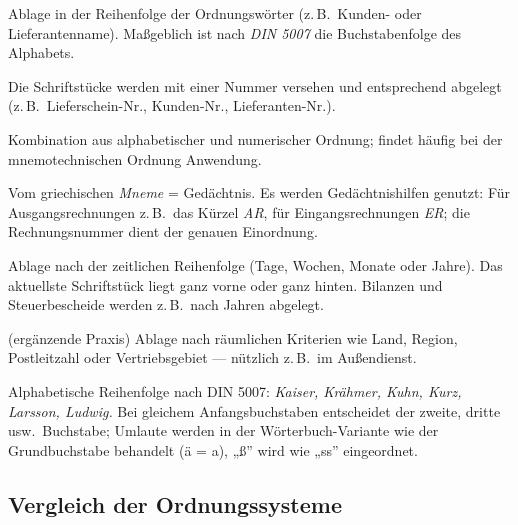 \documentclass[11pt, a4paper]{article}
\begin{document}
\begin{description}[leftmargin=1.2cm, style=nextline]
  \item[Alphabetische Ordnung] Ablage in der Reihenfolge der Ordnungswörter (z.\,B.\
    Kunden- oder Lieferantenname). Maßgeblich ist nach \emph{DIN 5007} die Buchstabenfolge
    des Alphabets.
  \item[Numerische Ordnung] Die Schriftstücke werden mit einer Nummer versehen und
    entsprechend abgelegt (z.\,B.\ Lieferschein-Nr., Kunden-Nr., Lieferanten-Nr.).
  \item[Alphanumerische Ordnung] Kombination aus alphabetischer und numerischer Ordnung;
    findet häufig bei der mnemotechnischen Ordnung Anwendung.
  \item[Mnemotechnische Ordnung] Vom griechischen \emph{Mneme} = Gedächtnis. Es werden
    Gedächtnishilfen genutzt: Für Ausgangsrechnungen z.\,B.\ das Kürzel \emph{AR}, für
    Eingangsrechnungen \emph{ER}; die Rechnungsnummer dient der genauen Einordnung.
  \item[Chronologische Ordnung] Ablage nach der zeitlichen Reihenfolge (Tage, Wochen,
    Monate oder Jahre). Das aktuellste Schriftstück liegt ganz vorne oder ganz hinten.
    Bilanzen und Steuerbescheide werden z.\,B.\ nach Jahren abgelegt.
  \item[Geografische Ordnung] (ergänzende Praxis) Ablage nach räumlichen Kriterien wie
    Land, Region, Postleitzahl oder Vertriebsgebiet --- nützlich z.\,B.\ im Außendienst.
\end{description}

\begin{beispiel}
Alphabetische Reihenfolge nach DIN 5007: \emph{Kaiser, Krähmer, Kuhn, Kurz, Larsson,
Ludwig.} Bei gleichem Anfangsbuchstaben entscheidet der zweite, dritte usw.\ Buchstabe;
Umlaute werden in der Wörterbuch-Variante wie der Grundbuchstabe behandelt (ä = a),
„ß” wird wie „ss” eingeordnet.
\end{beispiel}

\subsection{Vergleich der Ordnungssysteme}
\end{document}
